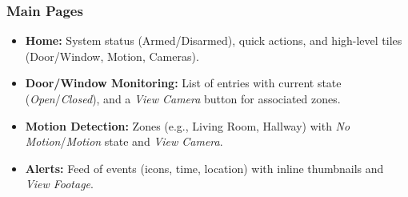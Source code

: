 \documentclass[conference]{IEEEtran}
\begin{document}
\subsubsection{Main Pages}
\begin{itemize}
  \item \textbf{Home:} System status (Armed/Disarmed), quick actions, and high-level tiles (Door/Window, Motion, Cameras).
  \item \textbf{Door/Window Monitoring:} List of entries with current state (\emph{Open}/\emph{Closed}), and a \emph{View Camera} button for associated zones.
  \item \textbf{Motion Detection:} Zones (e.g., Living Room, Hallway) with \emph{No Motion}/\emph{Motion} state and \emph{View Camera}.
  \item \textbf{Alerts:} Feed of events (icons, time, location) with inline thumbnails and \emph{View Footage}.
\end{itemize}
\end{document}
